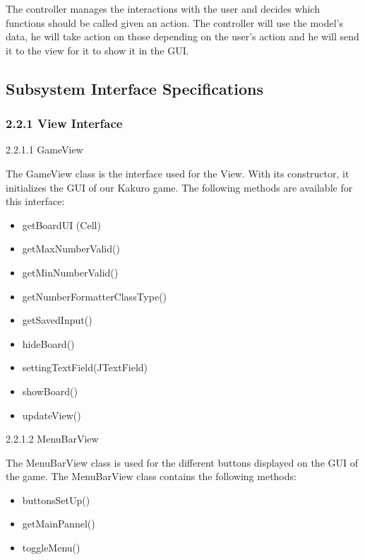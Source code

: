 \documentclass[12pt]{article}
\begin{document}
The controller manages the interactions with the user and decides which functions should be called given an action. The controller will use the model’s data, he will take action on those depending on the user’s action and he will send it to the view for it to show it in the GUI.\newline


\subsection{Subsystem Interface Specifications}

\subsubsection{2.2.1 View Interface}

2.2.1.1 GameView \newline

The GameView class is the interface used for the View. With its constructor, it initializes the GUI of our Kakuro game. The following methods are available for this interface:
\newline
\begin{itemize}
\item getBoardUI (Cell)
\item getMaxNumberValid()
\item getMinNumberValid()
\item getNumberFormatterClassType()
\item getSavedInput()
\item hideBoard()
\item settingTextField(JTextField)
\item showBoard()
\item updateView()\newline
\end{itemize} 


2.2.1.2 MenuBarView\newline

The MenuBarView class is used for the different buttons displayed on the GUI of the game. The MenuBarView class contains the following methods:
\newline
\begin{itemize}
\item buttonsSetUp()
\item getMainPannel()
\item toggleMenu() \newline
\end{itemize}
\end{document}
